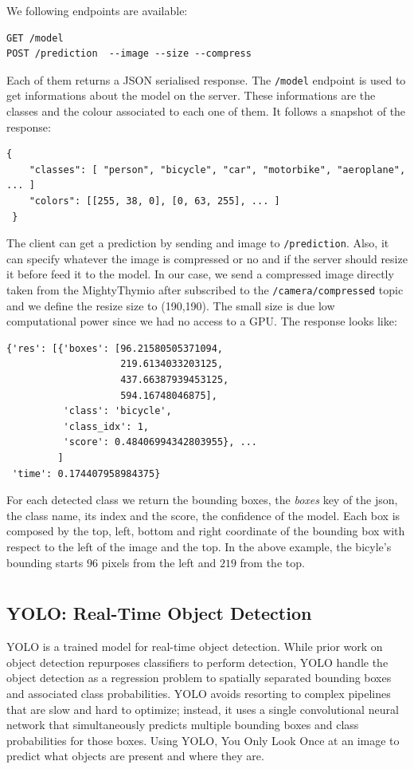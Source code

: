 \documentclass[letterpaper, 10 pt, conference]{ieeeconf}  %
\begin{document}
We following endpoints are available:
\begin{lstlisting}
GET /model
POST /prediction  --image --size --compress
\end{lstlisting}
Each of them returns a JSON serialised response. The \texttt{/model} endpoint is used to get informations about the model on the server. These informations are the classes and the colour associated to each one of them. It follows a snapshot of the response:
\begin{lstlisting}
{
    "classes": [ "person", "bicycle", "car", "motorbike", "aeroplane", ... ]
    "colors": [[255, 38, 0], [0, 63, 255], ... ]   
 }
\end{lstlisting}
The client can get a prediction by sending and image to \texttt{/prediction}. Also, it can specify whatever the  image is compressed or no and if the server should resize it before feed it to the model. In our case, we send a compressed image directly taken from the MightyThymio after subscribed to the \texttt{/camera/compressed} topic and we define the resize size to (190,190). The small size is due low computational power since we had no access to a GPU. The response looks like:
\begin{lstlisting}
{'res': [{'boxes': [96.21580505371094,
                    219.6134033203125,
                    437.66387939453125,
                    594.16748046875],
          'class': 'bicycle',
          'class_idx': 1,
          'score': 0.48406994342803955}, ...
         ]
 'time': 0.174407958984375}
\end{lstlisting}
For each detected class we return the bounding boxes, the \emph{boxes} key of the json, the class name, its index and the score, the confidence of the model. Each box is composed by the top, left, bottom and right coordinate of the bounding box with respect to the left of the image and the top. In the above example, the bicyle's bounding starts $96$ pixels from the left and $219$ from the top.
\section{}

\subsection{YOLO: Real-Time Object Detection}

YOLO \cite{DBLP:conf/cvpr/RedmonDGF16} is a trained model for real-time object detection. While prior work on object detection repurposes classifiers to perform detection, YOLO handle the object detection as a regression problem to spatially separated bounding boxes and associated class probabilities. YOLO avoids resorting to complex pipelines that are slow and hard to optimize; instead, it uses a single convolutional neural network that simultaneously predicts multiple bounding boxes and class probabilities for those boxes. Using YOLO, You Only Look Once at an image to predict what objects are present and where they are.
\end{document}

